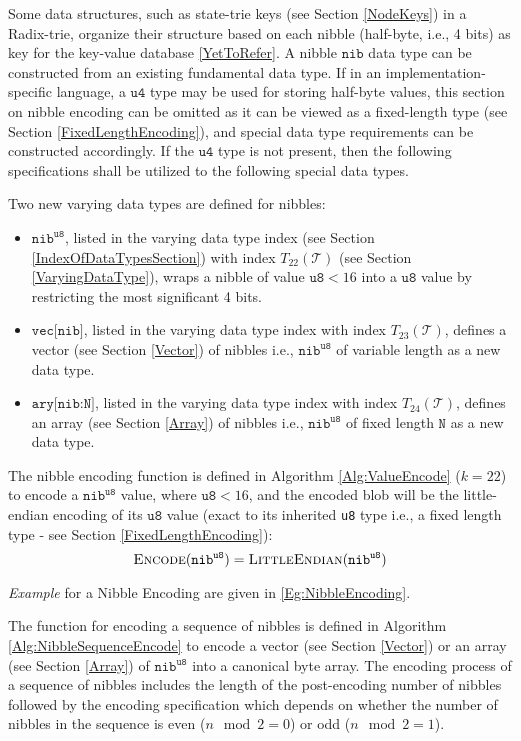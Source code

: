 \documentclass[../alan-handbook.tex]{subfiles}
\begin{document}
\label{NibbleEncoding}

Some data structures, such as state-trie keys (see Section \ref{NodeKeys}) in a Radix-trie, organize their structure based on each nibble (half-byte, i.e., 4 bits) as key for the key-value database \ref{YetToRefer}. A nibble $\texttt{nib}$ data type can be constructed from an existing fundamental data type. If in an implementation-specific language, a $\texttt{u4}$ type may be used for storing half-byte values, this section on nibble encoding can be omitted as it can be viewed as a fixed-length type (see Section \ref{FixedLengthEncoding}), and special data type requirements can be constructed accordingly. If the $\texttt{u4}$ type is not present, then the following specifications shall be utilized to the following special data types.

Two new varying data types are defined for nibbles:
\begin{itemize}
    \item $\texttt{nib}^{\texttt{u8}}$, listed in the varying data type index (see Section \ref{IndexOfDataTypesSection}) with index $T_{22}(\mathcal{T})$ (see Section \ref{VaryingDataType}), wraps a nibble of value $\texttt{u8}<16$ into a $\texttt{u8}$ value by restricting the most significant 4 bits.
    \item $\texttt{vec[nib]}$, listed in the varying data type index with index $T_{23}(\mathcal{T})$, defines a vector (see Section \ref{Vector}) of nibbles i.e., $\texttt{nib}^{\texttt{u8}}$ of variable length as a new data type.
    \item $\texttt{ary[nib:N]}$, listed in the varying data type index with index $T_{24}(\mathcal{T})$, defines an array (see Section \ref{Array}) of nibbles i.e., $\texttt{nib}^{\texttt{u8}}$ of fixed length $\texttt{N}$ as a new data type.
\end{itemize}

The nibble encoding function is defined in Algorithm \ref{Alg:ValueEncode} ($k=22$) to encode a $\texttt{nib}^{\texttt{u8}}$ value, where $\texttt{u8}<16$, and the encoded blob will be the little-endian encoding of its $\texttt{u8}$ value (exact to its inherited \texttt{u8} type i.e., a fixed length type - see Section \ref{FixedLengthEncoding}):
$$\Call{Encode}{\texttt{nib}^{\texttt{u8}}} = \Call{LittleEndian}{\texttt{nib}^{\texttt{u8}}}$$

\textit{Example} for a Nibble Encoding are given in \ref{Eg:NibbleEncoding}.

The function for encoding a sequence of nibbles is defined in Algorithm \ref{Alg:NibbleSequenceEncode} to encode a vector (see Section \ref{Vector}) or an array (see Section \ref{Array}) of $\texttt{nib}^{\texttt{u8}}$ into a canonical byte array. The encoding process of a sequence of nibbles includes the length of the post-encoding number of nibbles followed by the encoding specification which depends on whether the number of nibbles in the sequence is even ($n \mod 2 = 0$) or odd ($n \mod 2 = 1$).
\end{document}
